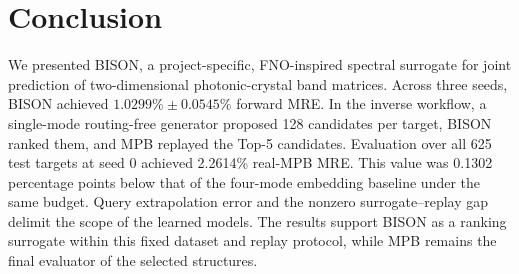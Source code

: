 
\section{Conclusion}

We presented BISON, a project-specific, FNO-inspired spectral surrogate for
joint prediction of two-dimensional photonic-crystal band matrices. Across
three seeds, BISON achieved \(1.0299\%\pm0.0545\%\) forward MRE. In the
inverse workflow, a single-mode routing-free generator proposed 128 candidates
per target, BISON ranked them, and MPB replayed the Top-5 candidates. Evaluation
over all 625 test targets at seed 0 achieved 2.2614\% real-MPB MRE. This value
was 0.1302 percentage points below that of the four-mode embedding baseline
under the same budget. Query extrapolation error and the nonzero
surrogate--replay gap delimit the scope of the learned models. The results
support BISON as a ranking surrogate within this fixed dataset and replay
protocol, while MPB remains the final evaluator of the selected structures.
